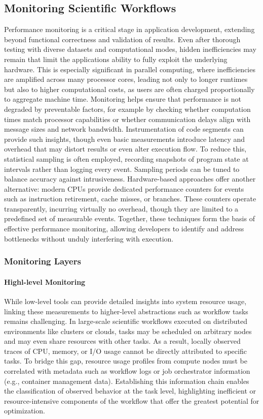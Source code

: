 \subsection{Monitoring Scientific Workflows}
\label{sec:background_monitoring}
Performance monitoring is a critical stage in application development, extending beyond functional correctness and validation of results. Even after thorough testing with diverse datasets and computational modes, hidden inefficiencies may remain that limit the applications ability to fully exploit the underlying hardware. This is especially significant in parallel computing, where inefficiencies are amplified across many processor cores, leading not only to longer runtimes but also to higher computational costs, as users are often charged proportionally to aggregate machine time. Monitoring helps ensure that performance is not degraded by preventable factors, for example by checking whether computation times match processor capabilities or whether communication delays align with message sizes and network bandwidth. Instrumentation of code segments can provide such insights, though even basic measurements introduce latency and overhead that may distort results or even alter execution flow. To reduce this, statistical sampling is often employed, recording snapshots of program state at intervals rather than logging every event. Sampling periods can be tuned to balance accuracy against intrusiveness. Hardware-based approaches offer another alternative: modern CPUs provide dedicated performance counters for events such as instruction retirement, cache misses, or branches. These counters operate transparently, incurring virtually no overhead, though they are limited to a predefined set of measurable events. Together, these techniques form the basis of effective performance monitoring, allowing developers to identify and address bottlenecks without unduly interfering with execution.

\subsubsection{Monitoring Layers}
\label{sec:background_monitoring_layers}
\paragraph{Highl-level Monitoring}
While low-level tools can provide detailed insights into system resource usage, linking these measurements to higher-level abstractions such as workflow tasks remains challenging. In large-scale scientific workflows executed on distributed environments like clusters or clouds, tasks may be scheduled on arbitrary nodes and may even share resources with other tasks. As a result, locally observed traces of CPU, memory, or I/O usage cannot be directly attributed to specific tasks. To bridge this gap, resource usage profiles from compute nodes must be correlated with metadata such as workflow logs or job orchestrator information (e.g., container management data). Establishing this information chain enables the classification of observed behavior at the task level, highlighting inefficient or resource-intensive components of the workflow that offer the greatest potential for optimization.

